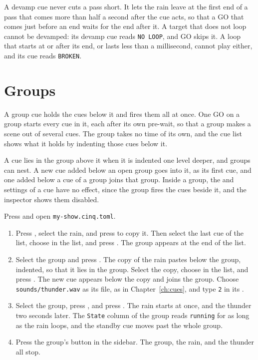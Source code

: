 A devamp cue never cuts a pass short.  It lets the rain leave at the first
end of a pass that comes more than half a second after the cue acts, so that a
GO that comes just before an end waits for the end after it.  A target that
does not loop cannot be devamped: its devamp cue reads \texttt{NO LOOP}, and GO
skips it.  A loop that starts at or after its end, or lasts less than a
millisecond, cannot play either, and its cue reads \texttt{BROKEN}\@.

\section{Groups}

A group cue holds the cues below it and fires them all at once.  One GO on a
group starts every cue in it, each after its own pre-wait, so that a group
makes a scene out of several cues.  The group takes no time of its own, and
the cue list shows what it holds by indenting those cues below it.

A cue lies in the group above it when it is indented one level deeper, and
groups can nest.  A new cue added below an open group goes into it, as its
first cue, and one added below a cue of a group joins that group.  Inside a
group, the  and  settings of a cue have no effect, since
the group fires the cues beside it, and the inspector shows them disabled.

Press  and open \texttt{my-show.cinq.toml}.

\begin{enumerate}
\item Press , select the rain, and press  to copy it.  Then
  select the last cue of the list, choose  in the  list,
  and press \@.  The group appears at the end of the list.
\item Select the group and press .  The copy of the rain pastes below
  the group, indented, so that it lies in the group.  Select the copy, choose
   in the  list, and press \@.  The new cue
  appears below the copy and joins the group.  Choose
  \texttt{sounds/thunder.wav} as its file, as in Chapter~\ref{ch:cues}, and
  type \texttt{2} in its .
\item Select the group, press , and press \@.  The
  rain starts at once, and the thunder two seconds later.  The
  \texttt{State} column of the group reads \texttt{running} for as long as the
  rain loops, and the standby cue moves past the whole group.
\item Press the group's  button in the sidebar.  The group, the rain,
  and the thunder all stop.
\end{enumerate}

